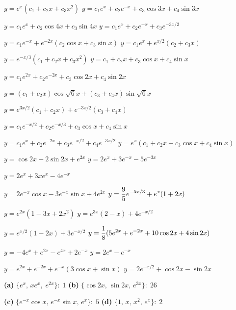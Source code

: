 \medskip

 $y=e^{x}(c_{1}+c_{2}x+c_{3}x^{2})$\;
 $y=c_{1}e^{x}+c_{2}e^{-x}+c_{3}\cos3x+c_{4}\sin3x$

  $y=c_{1}e^{x}+c_{2}\cos4x+c_{3}\sin4x$\;
 $y=c_{1}e^{x}+c_{2}e^{-x}+c_{3}e^{-3x/2}$

$y=c_{1}e^{-x}+e^{-2x}(c_{2}\cos x+c_{3}\sin x)$\;
$y=c_{1}e^{x}+e^{x/2}(c_{2}+c_{3}x)$

 $y=e^{-x/3}(c_{1}+c_{2}x+c_{3}x^{2})$\;
 $y=c_{1}+c_{2}x+c_{3}\cos x+c_{4}\sin x$

 $y=c_{1}e^{2x}+c_{2}e^{-2x}+c_{3}\cos2x+c_{4}\sin2x$\;

 $y=(c_{1}+c_{2}x)\cos\sqrt{6}x+(c_{3}+c_{4}x)\sin\sqrt{6}x$

$y=e^{3x/2}(c_{1}+c_{2}x)+e^{-3x/2}(c_{3}+c_{4}x)$\;

$y=c_{1}e^{-x/2}+c_{2}e^{-x/3}+c_{3}\cos x+c_{4}\sin x$

$y=c_{1}e^{x}+c_{2}e^{-2x}+c_{3}e^{-x/2}+c_{4}e^{-3x/2}$\;
$y=e^{x}(c_{1}+c_{2}x+c_{3}\cos x+c_{4}\sin x)$

  $y=\cos2x-2\sin2x+e^{2x}$\;
   $y=2e^{x}+3e^{-x}-5e^{-3x}$

  $y=2e^{x}+3xe^{x}-4e^{-x}$

 $y=2e^{-x}\cos x-3e^{-x}\sin x+4e^{2x}$
 $y=\displaystyle\frac{9}{5}e^{-5x/3}+e^{x}(1+2x)$

 $y=e^{2x}(1-3x+2x^{2})$
 $y=e^{3x}(2-x)+4e^{-x/2}$

 $y=e^{x/2}(1-2x)+3e^{-x/2}$
 $y=\displaystyle\frac{1}{8}(5e^{2x}+e^{-2x}+10\cos2x+4\sin2x)$

 $y=-4e^{x}+e^{2x}-e^{4x}+2e^{-x}$
 $y=2e^{x}-e^{-x}$

 $y=e^{2x}+e^{-2x}+e^{-x}(3\cos x+\sin x)$
 $y=2e^{-x/2}+\cos2x-\sin2x$

{\bf (a)} $\{e^{x},\,xe^{x},\;e^{2x}\}:\;1$
{\bf (b)} $\{\cos2x,\,\sin2x,\,e^{3x}\}:\;26$

\quad\;  \;
 {\bf (c)} $\{e^{-x}\cos x,\,e^{-x}\sin x,\,e^{x}\}:\;5$
 {\bf (d)} $\{1,\,x,\,x^{2},\,e^{x}\}: \; 2$

